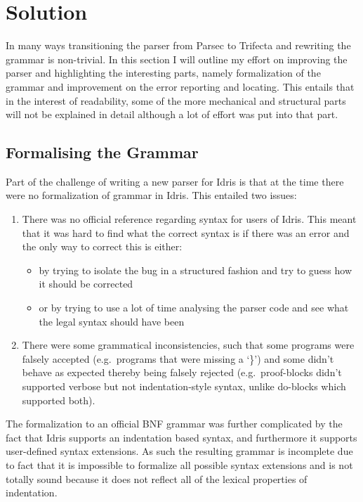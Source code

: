 \documentclass[a4paper]{article}%
\begin{document}
\section{Solution}
\label{sec:Solution}
In many ways transitioning the parser from Parsec to Trifecta and rewriting the grammar is non-trivial.
In this section I will outline my effort on improving the parser and highlighting the interesting parts, namely formalization of the grammar and improvement on the error reporting and locating.
This entails that in the interest of readability, some of the more mechanical and structural parts will not be explained in detail although a lot of effort was put into that part.

\subsection{Formalising the Grammar}
\label{sub:FormalisingtheGrammar}
Part of the challenge of writing a new parser for Idris is that at the time there were no formalization of grammar in Idris.
This entailed two issues:
\begin{enumerate}
  \item There was no official reference regarding syntax for users of Idris. This meant that it was hard to find what the correct syntax is if there was an error and the only way to correct this is either:
    \begin{itemize}
      \item by trying to isolate the bug in a structured fashion and try to guess how it should be corrected
      \item or by trying to use a lot of time analysing the parser code and see what the legal syntax should have been
    \end{itemize}
\item There were some grammatical inconsistencies, such that some programs were falsely accepted (e.g.\ programs that were missing a `\}') and some didn't behave as expected thereby being falsely rejected (e.g.\ proof-blocks didn't supported verbose but not indentation-style syntax, unlike do-blocks which supported both).
\end{enumerate}

The formalization to an official BNF grammar was further complicated by the fact that Idris supports an indentation based syntax, and furthermore it supports user-defined syntax extensions. As such the resulting grammar is incomplete due to fact that
it is impossible to formalize all possible syntax extensions and is not totally sound because it does not reflect all of the lexical properties of indentation.
\end{document}
